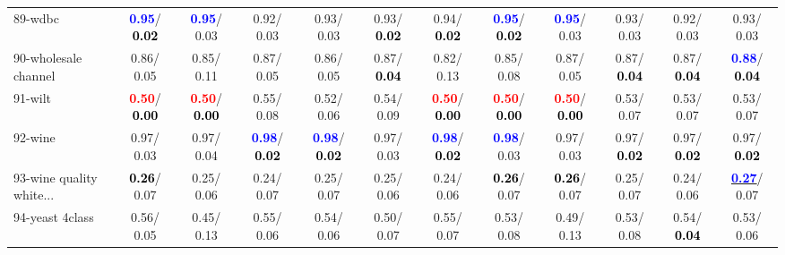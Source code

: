 \begin{table}[h]
\begin{center}
{\begin{tabular}{lc|c|c|c|c|c|c|c|c|c|c}
89-wdbc & \textcolor{blue}{\textbf{  0.95}}/\textcolor{black}{\textbf{  0.02}} & \textcolor{blue}{\textbf{  0.95}}/  0.03 &   0.92/  0.03 &   0.93/  0.03 &   0.93/\textcolor{black}{\textbf{  0.02}} &   0.94/\textcolor{black}{\textbf{  0.02}} & \textcolor{blue}{\textbf{  0.95}}/\textcolor{black}{\textbf{  0.02}} & \textcolor{blue}{\textbf{  0.95}}/  0.03 &   0.93/  0.03 &   0.92/  0.03 &   0.93/  0.03 \\
90-wholesale channel &   0.86/  0.05 &   0.85/  0.11 &   0.87/  0.05 &   0.86/  0.05 &   0.87/\textcolor{black}{\textbf{  0.04}} &   0.82/  0.13 &   0.85/  0.08 &   0.87/  0.05 &   0.87/\textcolor{black}{\textbf{  0.04}} &   0.87/\textcolor{black}{\textbf{  0.04}} & \textcolor{blue}{\textbf{  0.88}}/\textcolor{black}{\textbf{  0.04}} \\
91-wilt & \textcolor{red}{\textbf{  0.50}}/\textcolor{black}{\textbf{  0.00}} & \textcolor{red}{\textbf{  0.50}}/\textcolor{black}{\textbf{  0.00}} &   0.55/  0.08 &   0.52/  0.06 &   0.54/  0.09 & \textcolor{red}{\textbf{  0.50}}/\textcolor{black}{\textbf{  0.00}} & \textcolor{red}{\textbf{  0.50}}/\textcolor{black}{\textbf{  0.00}} & \textcolor{red}{\textbf{  0.50}}/\textcolor{black}{\textbf{  0.00}} &   0.53/  0.07 &   0.53/  0.07 &   0.53/  0.07 \\
92-wine &   0.97/  0.03 &   0.97/  0.04 & \textcolor{blue}{\textbf{  0.98}}/\textcolor{black}{\textbf{  0.02}} & \textcolor{blue}{\textbf{  0.98}}/\textcolor{black}{\textbf{  0.02}} &   0.97/  0.03 & \textcolor{blue}{\textbf{  0.98}}/\textcolor{black}{\textbf{  0.02}} & \textcolor{blue}{\textbf{  0.98}}/  0.03 &   0.97/  0.03 &   0.97/\textcolor{black}{\textbf{  0.02}} &   0.97/\textcolor{black}{\textbf{  0.02}} &   0.97/\textcolor{black}{\textbf{  0.02}} \\ \hline
93-wine quality white... & \textcolor{black}{\textbf{  0.26}}/  0.07 &   0.25/  0.06 &   0.24/  0.07 &   0.25/  0.07 &   0.25/  0.06 &   0.24/  0.06 & \textcolor{black}{\textbf{  0.26}}/  0.07 & \textcolor{black}{\textbf{  0.26}}/  0.07 &   0.25/  0.07 &   0.24/  0.06 & \underline{\textcolor{blue}{\textbf{  0.27}}}/  0.07 \\
94-yeast 4class &   0.56/  0.05 &   0.45/  0.13 &   0.55/  0.06 &   0.54/  0.06 &   0.50/  0.07 &   0.55/  0.07 &   0.53/  0.08 &   0.49/  0.13 &   0.53/  0.08 &   0.54/\textcolor{black}{\textbf{  0.04}} &   0.53/  0.06 \\\end{tabular}}\label{stratsBalAcc2bVFDT}
\end{center}
\end{table}